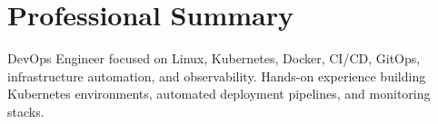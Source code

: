\section{Professional Summary}

DevOps Engineer focused on Linux, Kubernetes, Docker, CI/CD,
GitOps, infrastructure automation, and observability.
Hands-on experience building Kubernetes environments,
automated deployment pipelines, and monitoring stacks.
